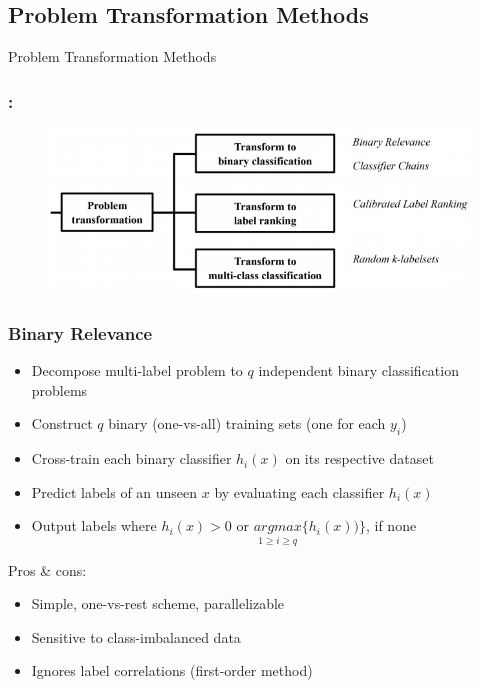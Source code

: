 \documentclass{beamer}
\begin{document}
\subsection{Problem Transformation Methods}
\begin{frame}
\Huge{\centerline{Problem Transformation Methods}}
\end{frame}
\begin{frame}
\frametitle{\insertsection : \insertsubsection}
\begin{figure}
	\begin{center}
		\includegraphics[scale = 0.7]{images/pt.png}
	\end{center}
\end{figure}
\end{frame}
\begin{frame}
\frametitle{Binary Relevance}

\begin{itemize}
	\item Decompose multi-label problem to $q$ independent binary classification problems
	\item Construct $q$ binary (one-vs-all) training sets (one for each $y_i$)
	\item Cross-train each binary classifier $h_i(x)$ on its respective dataset
	
	\item Predict labels of an unseen $x$ by evaluating each classifier $h_i(x)$
	\item Output labels where  $h_i(x) > 0$ or $\underset{1 \geq i \geq q}{argmax} \{h_i(x))\}$, if none
\end{itemize}

Pros \& cons:
\begin{itemize}
	\item Simple, one-vs-rest scheme, parallelizable
	\item Sensitive to class-imbalanced data
	\item Ignores label correlations (first-order method)
\end{itemize}

\end{frame}
\end{document}
